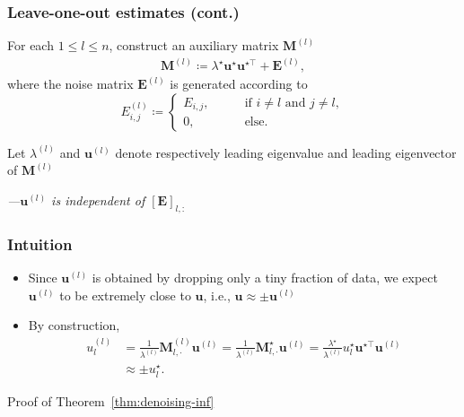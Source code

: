 \documentclass[compress,
mathserif,wide,%
]{beamer}
\begin{document}
\begin{frame}
\frametitle{Leave-one-out estimates (cont.)}
	For each $1\leq l\leq n$, construct an auxiliary matrix  $\bm{M}^{(l)}$ 
\begin{align*}
	\bm{M}^{(l)} \coloneqq \lambda^{\star}\bm{u}^{\star}\bm{u}^{\star\top}+\bm{E}^{(l)} , 
\end{align*}
%
where the noise matrix $\bm{E}^{(l)}$ is generated according to
%
\begin{equation*}
E_{i,j}^{(l)} \coloneqq
\begin{cases}
E_{i,j},\qquad & \text{if }i\neq l\text{ and }j\neq l, \\
0, & \text{else}.
\end{cases}
\end{equation*}

Let $\lambda^{(l)}$ and $\bm{u}^{(l)}$ denote respectively leading eigenvalue and leading eigenvector of $\bm{M}^{(l)}$

{\hfill \em ---$\bm{u}^{(l)}$ is independent of $[ \bm {E} ]_{l, :}$}
\end{frame}

\begin{frame}
	\frametitle{Intuition}
	\begin{itemize}
		\item Since $\bm{u}^{(l)}$ is obtained by dropping only a tiny fraction of data, we expect $\bm{u}^{(l)}$ to be extremely close to $\bm{u}$, i.e., $\bm{u} \approx \pm \bm{u}^{(l)}$
		\item By construction, 
		\begin{align*}
		u_{l}^{(l)} & =\frac{1}{\lambda^{(l)}}\bm{M}_{l,\cdot}^{(l)}\bm{u}^{(l)}=\frac{1}{\lambda^{(l)}}\bm{M}_{l,\cdot}^{\star}\bm{u}^{(l)}=\frac{\lambda^{\star}}{\lambda^{(l)}}u_{l}^{\star}\bm{u}^{\star\top}\bm{u}^{(l)}   \\
		& \approx \pm u_{l}^{\star}.
	\end{align*}
	\end{itemize}
\end{frame}

\begin{frame}[plain]
\vfill
\centering
\large Proof of Theorem~\ref{thm:denoising-inf}
\vfill
\end{frame}
\end{document}
